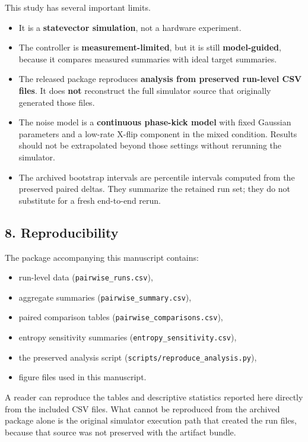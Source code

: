 \documentclass[
]{article}
\providecommand{\tightlist}{%
  \setlength{\itemsep}{0pt}\setlength{\parskip}{0pt}}
\begin{document}
This study has several important limits.

\begin{itemize}
\tightlist
\item
  It is a \textbf{statevector simulation}, not a hardware experiment.
\item
  The controller is \textbf{measurement-limited}, but it is still
  \textbf{model-guided}, because it compares measured summaries with
  ideal target summaries.
\item
  The released package reproduces \textbf{analysis from preserved
  run-level CSV files}. It does \textbf{not} reconstruct the full
  simulator source that originally generated those files.
\item
  The noise model is a \textbf{continuous phase-kick model} with fixed
  Gaussian parameters and a low-rate X-flip component in the mixed
  condition. Results should not be extrapolated beyond those settings
  without rerunning the simulator.
\item
  The archived bootstrap intervals are percentile intervals computed
  from the preserved paired deltas. They summarize the retained run set;
  they do not substitute for a fresh end-to-end rerun.
\end{itemize}

\subsection{8. Reproducibility}\label{reproducibility}

The package accompanying this manuscript contains:

\begin{itemize}
\tightlist
\item
  run-level data (\texttt{pairwise\_runs.csv}),
\item
  aggregate summaries (\texttt{pairwise\_summary.csv}),
\item
  paired comparison tables (\texttt{pairwise\_comparisons.csv}),
\item
  entropy sensitivity summaries (\texttt{entropy\_sensitivity.csv}),
\item
  the preserved analysis script
  (\texttt{scripts/reproduce\_analysis.py}),
\item
  figure files used in this manuscript.
\end{itemize}

A reader can reproduce the tables and descriptive statistics reported
here directly from the included CSV files. What cannot be reproduced
from the archived package alone is the original simulator execution path
that created the run files, because that source was not preserved with
the artifact bundle.
\end{document}
